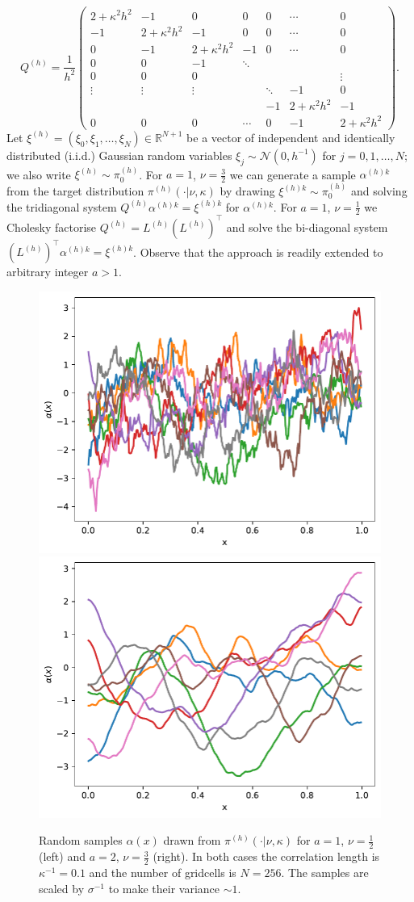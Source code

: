 \documentclass[11pt]{article}
\begin{document}
\begin{equation}
    Q^{(h)} = \frac{1}{h^2}\begin{pmatrix}
        2 +\kappa^2h^2 & -1 & 0 & 0 & 0&\cdots & 0\\
            -1 & 2+\kappa^2h^2 & - 1  & 0 &0& \cdots & 0\\
            0 & -1 & 2+\kappa^2h^2 & - 1 & 0 & \cdots & 0\\
            0 & 0 & -1& \ddots\\
            0&0&0&&&&\vdots\\
            \vdots & \vdots &\vdots&&\ddots &-1 & 0\\
             &  &  & & -1 &  2+\kappa^2h^2 & -1\\
            0 & 0 & 0 & \cdots &0 &  -1  & 2+\kappa^2h^2
    \end{pmatrix}.
\end{equation}
Let $\xi^{(h)}=(\xi_0,\xi_1,\dots,\xi_N)\in\mathbb{R}^{N+1}$ be a vector of independent and identically distributed (i.i.d.) Gaussian random variables $\xi_j\sim\mathcal{N}(0,h^{-1})$ for $j=0,1,\dots,N$; we also write $\xi^{(h)}\sim \pi_0^{(h)}$. For $a=1$, $\nu=\frac{3}{2}$ we can generate a sample $\alpha^{(h)k}$ from the target distribution $\pi^{(h)}(\cdot|\nu,\kappa)$ by drawing $\xi^{(h)k}\sim \pi_0^{(h)}$ and solving the tridiagonal system $Q^{(h)}\alpha^{(h)k}=\xi^{(h)k}$ for $\alpha^{(h)k}$. For $a=1$, $\nu=\frac{1}{2}$ we Cholesky factorise $Q^{(h)}=L^{(h)}(L^{(h)})^\top$ and solve the bi-diagonal system $(L^{(h)})^\top\alpha^{(h)k}= \xi^{(h)k}$. Observe that the approach is readily extended to arbitrary integer $a>1$.
\begin{figure}
    \begin{center}
        \includegraphics[width=0.45\linewidth]{figures/samples_nu0_5.pdf}
        \hfill
        \includegraphics[width=0.45\linewidth]{figures/samples_nu1_5.pdf}
    \end{center}
    \caption{Random samples $\alpha(x)$ drawn from $\pi^{(h)}(\cdot|\nu,\kappa)$ for $a=1$, $\nu=\frac{1}{2}$ (left) and $a=2$, $\nu=\frac{3}{2}$ (right). In both cases the correlation length is $\kappa^{-1}=0.1$ and the number of gridcells is $N=256$. The samples are scaled by $\sigma^{-1}$ to make their variance $\sim 1$.}
    \label{fig:random_samples}
\end{figure}
\end{document}
